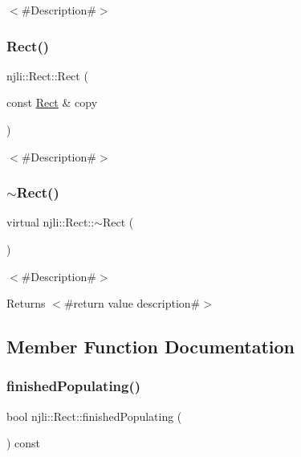 $<$\#\+Description\#$>$ \mbox{\label{classnjli_1_1_rect_a243933a940eb2dbb7ec885983298a909}} 
\subsubsection{\texorpdfstring{Rect()}{Rect()}\hspace{0.1cm}{\footnotesize\ttfamily [2/2]}}
{\footnotesize\ttfamily njli\+::\+Rect\+::\+Rect (\begin{DoxyParamCaption}\item[{const \mbox{\hyperlink{classnjli_1_1_rect}{Rect}} \&}]{copy }\end{DoxyParamCaption})}

$<$\#\+Description\#$>$ \mbox{\label{classnjli_1_1_rect_a5bf75eebecf25e183d78b9bc2efe1b00}} 
\subsubsection{\texorpdfstring{$\sim$\+Rect()}{~Rect()}}
{\footnotesize\ttfamily virtual njli\+::\+Rect\+::$\sim$\+Rect (\begin{DoxyParamCaption}{ }\end{DoxyParamCaption})\hspace{0.3cm}{\ttfamily [virtual]}}

$<$\#\+Description\#$>$

\begin{DoxyReturn}{Returns}
$<$\#return value description\#$>$ 
\end{DoxyReturn}


\subsection{Member Function Documentation}
\mbox{\label{classnjli_1_1_rect_a5587114924ea3614e3d51a772f17edeb}} 
\subsubsection{\texorpdfstring{finished\+Populating()}{finishedPopulating()}}
{\footnotesize\ttfamily bool njli\+::\+Rect\+::finished\+Populating (\begin{DoxyParamCaption}{ }\end{DoxyParamCaption}) const}

